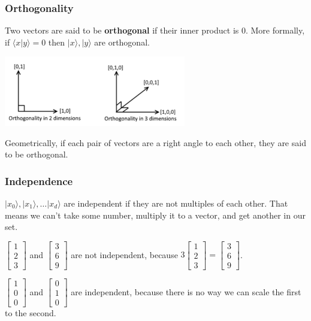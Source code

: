 \documentclass[12pt]{article}
\begin{document}
\subsubsection{Orthogonality}
Two vectors are said to be \textbf{orthogonal} if their inner product is 0. More formally, if $\langle x \vert y \rangle = 0$ then $\lvert x \rangle, \lvert y \rangle$ are orthogonal.

\begin{center}
	\includegraphics[width=300px]{Fig2}
\end{center}

Geometrically, if each pair of vectors are a right angle to each other, they are said to be orthogonal.

\subsubsection{Independence}

$\lvert x_0 \rangle, \lvert x_1 \rangle, \dots \lvert x_d \rangle$ are independent if they are not multiples of each other. That means we can't take some number, multiply it to a vector, and get another in our set.

$\begin{bmatrix} 1 \\ 2 \\ 3 \end{bmatrix}$ and $\begin{bmatrix} 3 \\ 6 \\ 9 \end{bmatrix}$ are not independent, because $3\begin{bmatrix} 1 \\ 2 \\ 3 \end{bmatrix} = \begin{bmatrix} 3 \\ 6 \\ 9 \end{bmatrix}$.

$\begin{bmatrix} 1 \\ 0 \\ 0 \end{bmatrix}$ and $\begin{bmatrix} 0 \\ 1 \\ 0 \end{bmatrix}$ are independent, because there is no way we can scale the first to the second. \\
\end{document}

